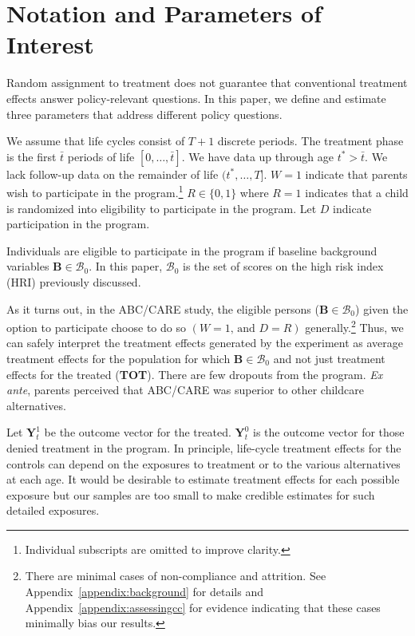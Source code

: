 \section{Notation and Parameters of Interest} \label{section:methodsquestions}

Random assignment to treatment does not guarantee that conventional treatment effects answer policy-relevant questions. In this paper, we define and estimate three parameters that address different policy questions.

We assume that life cycles consist of $T+1$ discrete periods. The treatment phase is the first $\bar{t}$ periods of life $\left[0,\dots,\bar{t}\right]$. We have data up through age $t^{*}>\bar{t}$. We lack follow-up data on the remainder of life $(t^*,\dots,T]$. $W=1$ indicate that parents wish to participate in the program.\footnote{Individual subscripts are omitted to improve clarity.} $R \in \{0,1\}$ where $R=1$ indicates that a child is randomized into eligibility to participate in the program. Let $D$ indicate participation in the program.

Individuals are eligible to participate in the program if baseline background variables $\bm{B}\in\mathcal{B}_0$. In this paper, $\mathcal{B}_0$ is the set of scores on the high risk index (HRI) previously discussed.

As it turns out, in the ABC/CARE study, the eligible persons ($\bm{B}\in\mathcal{B}_0$) given the option to participate choose to do so $(W=1\text{, and } D=R)$ generally.\footnote{There are minimal cases of non-compliance and attrition. See Appendix~\ref{appendix:background} for details and Appendix~\ref{appendix:assessingcc} for evidence indicating that these cases minimally bias our results.} Thus, we can safely interpret the treatment effects generated by the experiment as average treatment effects for the population for which $\bm{B}\in\mathcal{B}_0$ and not just treatment effects for the treated (\textbf{TOT}). There are few dropouts from the program. \emph{Ex ante}, parents perceived that ABC/CARE was superior to other childcare alternatives.

Let $\bm{Y}^1_t$ be the outcome vector for the treated. $\bm{Y}^0_t$ is the outcome vector for those denied treatment in the program. In principle, life-cycle treatment effects for the controls can depend on the exposures to treatment or to the various alternatives at each age. It would be desirable to estimate treatment effects for each possible exposure but our samples are too small to make credible estimates for such detailed exposures.

